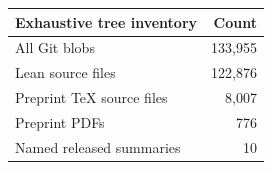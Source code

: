 \begin{tabular}{lr}
\toprule
Exhaustive tree inventory & Count \\
\midrule
All Git blobs & 133,955 \\
Lean source files & 122,876 \\
Preprint TeX source files & 8,007 \\
Preprint PDFs & 776 \\
Named released summaries & 10 \\
\bottomrule
\end{tabular}
